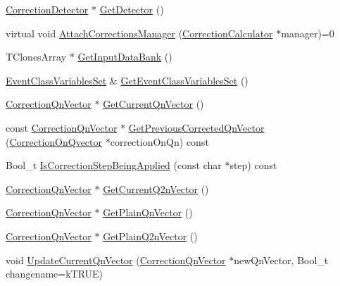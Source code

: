 \begin{DoxyCompactItemize}
\item 
\mbox{\hyperlink{classQn_1_1CorrectionDetector}{Correction\+Detector}} $\ast$ \mbox{\hyperlink{classQn_1_1DetectorConfiguration_a2a34cbc491d83fd5073bc4e9bb0d4943}{Get\+Detector}} ()
\item 
virtual void \mbox{\hyperlink{classQn_1_1DetectorConfiguration_a512c77d73e0e6453607f7ae7e2e8f72b}{Attach\+Corrections\+Manager}} (\mbox{\hyperlink{classQn_1_1CorrectionCalculator}{Correction\+Calculator}} $\ast$manager)=0
\item 
T\+Clones\+Array $\ast$ \mbox{\hyperlink{classQn_1_1DetectorConfiguration_a80b18020e8636295cdea1dd2c11449d3}{Get\+Input\+Data\+Bank}} ()
\item 
\mbox{\hyperlink{classQn_1_1EventClassVariablesSet}{Event\+Class\+Variables\+Set}} \& \mbox{\hyperlink{classQn_1_1DetectorConfiguration_a77df91021253bf6e5320bfe52b7147d7}{Get\+Event\+Class\+Variables\+Set}} ()
\item 
\mbox{\hyperlink{classQn_1_1CorrectionQnVector}{Correction\+Qn\+Vector}} $\ast$ \mbox{\hyperlink{classQn_1_1DetectorConfiguration_ae467babb14df7f6b264eb379dceff2dd}{Get\+Current\+Qn\+Vector}} ()
\item 
const \mbox{\hyperlink{classQn_1_1CorrectionQnVector}{Correction\+Qn\+Vector}} $\ast$ \mbox{\hyperlink{classQn_1_1DetectorConfiguration_aac09cc211d9fc911b61dbe14fdc4f5f3}{Get\+Previous\+Corrected\+Qn\+Vector}} (\mbox{\hyperlink{classQn_1_1CorrectionOnQvector}{Correction\+On\+Qvector}} $\ast$correction\+On\+Qn) const
\item 
Bool\+\_\+t \mbox{\hyperlink{classQn_1_1DetectorConfiguration_a25fce09641fb89b686154a6d6bad823a}{Is\+Correction\+Step\+Being\+Applied}} (const char $\ast$step) const
\item 
\mbox{\hyperlink{classQn_1_1CorrectionQnVector}{Correction\+Qn\+Vector}} $\ast$ \mbox{\hyperlink{classQn_1_1DetectorConfiguration_a8f2e955fc14f8db870a89fc4ab1dc36b}{Get\+Current\+Q2n\+Vector}} ()
\item 
\mbox{\hyperlink{classQn_1_1CorrectionQnVector}{Correction\+Qn\+Vector}} $\ast$ \mbox{\hyperlink{classQn_1_1DetectorConfiguration_a3d5ca70800045c579f4bda073a382f68}{Get\+Plain\+Qn\+Vector}} ()
\item 
\mbox{\hyperlink{classQn_1_1CorrectionQnVector}{Correction\+Qn\+Vector}} $\ast$ \mbox{\hyperlink{classQn_1_1DetectorConfiguration_a25396b7997264f317e5c4ee7d3dcaeac}{Get\+Plain\+Q2n\+Vector}} ()
\item 
void \mbox{\hyperlink{classQn_1_1DetectorConfiguration_a6e7228b694e8a1a15290c711f870a527}{Update\+Current\+Qn\+Vector}} (\mbox{\hyperlink{classQn_1_1CorrectionQnVector}{Correction\+Qn\+Vector}} $\ast$new\+Qn\+Vector, Bool\+\_\+t changename=k\+T\+R\+UE)

\end{DoxyCompactItemize}
